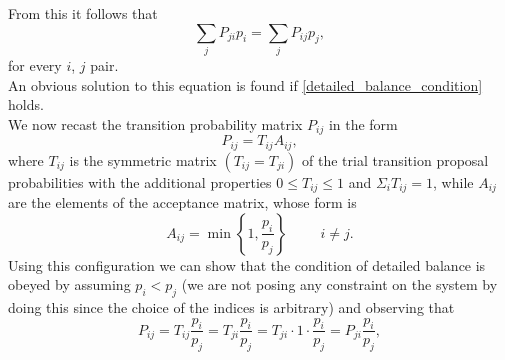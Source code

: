 From this it follows that 
\begin{equation}
    \sum_jP_{ji}p_i=\sum_jP_{ij}p_j,
\end{equation}
for every $i$, $j$ pair.\\
An obvious solution to this equation is found if \ref{detailed_balance_condition} holds.\\
We now recast the transition probability matrix $P_{ij}$ in the form
\begin{equation}
    P_{ij}=T_{ij}A_{ij},
\end{equation}
where $T_{ij}$ is the symmetric matrix $(T_{ij}=T_{ji})$ of the trial transition proposal probabilities with the additional properties 
$0\le T_{ij}\le 1$ and $\Sigma_i T_{ij}=1$, while $A_{ij}$ are the elements of the acceptance matrix, whose form is 
\begin{equation}
    A_{ij}=\min{\left\{1,\frac{p_i}{p_j}\right\}}\hspace{1cm}i\neq j.
\end{equation}
Using this configuration we can show that the condition of detailed balance is obeyed by assuming $p_i<p_j$ (we are not posing any constraint 
on the system by doing this since the choice of the indices is arbitrary) and observing that
\begin{equation}
    P_{ij}=T_{ij}\frac{p_i}{p_j}=T_{ji}\frac{p_i}{p_j}=T_{ji}\cdot 1\cdot\frac{p_i}{p_j}=P_{ji}\frac{p_i}{p_j},
\end{equation}
